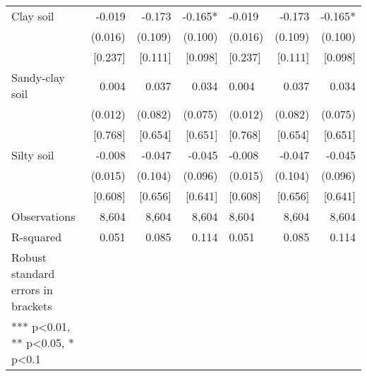 \documentclass[
]{article}
\begin{document}
\begin{ThreePartTable}
\begin{longtable}[t]{lrrrlrr}
Clay soil & -0.019 & -0.173 & -0.165* & -0.019 & -0.173 & -0.165*\\
 & (0.016) & (0.109) & (0.100) & (0.016) & (0.109) & (0.100)\\
 & {}[0.237] & {}[0.111] & {}[0.098] & {}[0.237] & {}[0.111] & {}[0.098]\\
Sandy-clay soil & 0.004 & 0.037 & 0.034 & 0.004 & 0.037 & 0.034\\
 & (0.012) & (0.082) & (0.075) & (0.012) & (0.082) & (0.075)\\
 & {}[0.768] & {}[0.654] & {}[0.651] & {}[0.768] & {}[0.654] & {}[0.651]\\
Silty soil & -0.008 & -0.047 & -0.045 & -0.008 & -0.047 & -0.045\\
 & (0.015) & (0.104) & (0.096) & (0.015) & (0.104) & (0.096)\\
 & {}[0.608] & {}[0.656] & {}[0.641] & {}[0.608] & {}[0.656] & {}[0.641]\\
Observations & 8,604 & 8,604 & 8,604 & 8,604 & 8,604 & 8,604\\
R-squared & 0.051 & 0.085 & 0.114 & 0.051 & 0.085 & 0.114\\
Robust standard errors in brackets &  &  &  &  &  & \\
*** p<0.01, ** p<0.05, * p<0.1 &  &  &  &  &  & \\*
\end{longtable}
\end{ThreePartTable}
\endgroup{}
\end{document}
